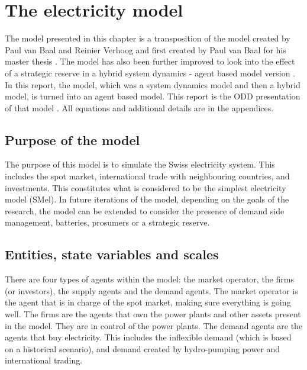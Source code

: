 \section{The electricity model}
\label{sec:CodeDocElec}

The model presented in this chapter is a transposition of the model created by Paul van Baal and Reinier Verhoog and first created by Paul van Baal for his master thesis \citep{van2016business}. The model has also been further improved to look into the effect of a strategic reserve in a hybrid system dynamics - agent based model version \citep{van2019effectiveness}. In this report, the model, which was a system dynamics model and then a hybrid model, is turned into an agent based model. This report is the ODD presentation of that model \citep{grimm2010odd}. All equations and additional details are in the appendices.

\subsection{Purpose of the model}
\label{ssec:purpose}

The purpose of this model is to simulate the Swiss electricity system. This includes the spot market, international trade with neighbouring countries, and investments. This constitutes what is considered to be the simplest electricity model (SMel). In future iterations of the model, depending on the goals of the research, the model can be extended to consider the presence of demand side management, batteries, prosumers or a strategic reserve.


\subsection{Entities, state variables and scales}
\label{ssec:entities}

There are four types of agents within the model: the market operator, the firms (or investors), the supply agents and the demand agents. The market operator is the agent that is in charge of the spot market, making sure everything is going well. The firms are the agents that own the power plants and other assets present in the model. They are in control of the  power plants. The demand agents are the agents that buy electricity. This includes the inflexible demand (which is based on a  historical scenario), and demand created by hydro-pumping power and international trading.

